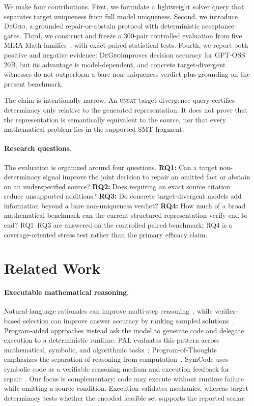 \documentclass[sigconf,anonymous]{aamas}
\newcommand{\method}{\textsc{DeGro}}
\newcommand{\unsat}{\textsc{unsat}}
\begin{document}
We make four contributions.  First, we formulate a lightweight solver query that separates target uniqueness from full model uniqueness.  Second, we introduce \method, a grounded repair-or-abstain protocol with deterministic acceptance gates.  Third, we construct and freeze a 300-pair controlled evaluation from five MIRA-Math families~\cite{albateh2026mira}, with exact paired statistical tests.  Fourth, we report both positive and negative evidence: \method improves decision accuracy for GPT-OSS 20B, but its advantage is model-dependent, and concrete target-divergent witnesses do not outperform a bare non-uniqueness verdict plus grounding on the present benchmark.

The claim is intentionally narrow.  An \unsat{} target-divergence query certifies determinacy only relative to the generated representation.  It does not prove that the representation is semantically equivalent to the source, nor that every mathematical problem lies in the supported SMT fragment.

\paragraph{Research questions.}
The evaluation is organized around four questions.  \textbf{RQ1:} Can a target non-determinacy signal improve the joint decision to repair an omitted fact or abstain on an underspecified source?  \textbf{RQ2:} Does requiring an exact source citation reduce unsupported additions?  \textbf{RQ3:} Do concrete target-divergent models add information beyond a bare non-uniqueness verdict?  \textbf{RQ4:} How much of a broad mathematical benchmark can the current structured representation verify end to end?  RQ1--RQ3 are answered on the controlled paired benchmark; RQ4 is a coverage-oriented stress test rather than the primary efficacy claim.

\section{Related Work}
\paragraph{Executable mathematical reasoning.}
Natural-language rationales can improve multi-step reasoning~\cite{wei2022cot}, while verifier-based selection can improve answer accuracy by ranking sampled solutions~\cite{cobbe2021verifiers}.  Program-aided approaches instead ask the model to generate code and delegate execution to a deterministic runtime.  PAL evaluates this pattern across mathematical, symbolic, and algorithmic tasks~\cite{gao2023pal}; Program-of-Thoughts emphasizes the separation of reasoning from computation~\cite{chen2023pot}.  SymCode uses symbolic code as a verifiable reasoning medium and execution feedback for repair~\cite{nezhad2026symcode}.  Our focus is complementary: code may execute without runtime failure while omitting a source condition.  Execution validates mechanics, whereas target determinacy tests whether the encoded feasible set supports the reported scalar.
\end{document}
